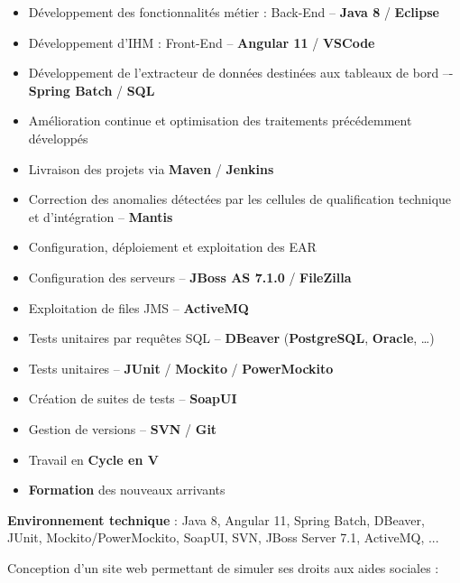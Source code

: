 \documentclass[12pt,a4paper,sans]{moderncv} %
\begin{document}
{\begin{itemize}
\item Développement des fonctionnalités métier : Back-End -- \textbf{Java 8} / \textbf{Eclipse}
\item Développement d'IHM : Front-End -- \textbf{Angular 11} / \textbf{VSCode}
\item Développement de l'extracteur de données destinées aux tableaux de bord –- \textbf{Spring Batch} / \textbf{SQL}
\item Amélioration continue et optimisation des traitements précédemment développés
\item Livraison des projets via \textbf{Maven} / \textbf{Jenkins}
\item Correction des anomalies détectées par les cellules de qualification technique et d’intégration -- \textbf{Mantis}
\item Configuration, déploiement et exploitation des EAR
\item Configuration des serveurs -- \textbf{JBoss AS 7.1.0} / \textbf{FileZilla}
\item Exploitation de files JMS -- \textbf{ActiveMQ}
\item Tests unitaires par requêtes SQL -- \textbf{DBeaver} (\textbf{PostgreSQL}, \textbf{Oracle}, …)
\item Tests unitaires -- \textbf{JUnit} / \textbf{Mockito} / \textbf{PowerMockito}
\item Création de suites de tests -- \textbf{SoapUI}
\item Gestion de versions -- \textbf{SVN} / \textbf{Git}
\item Travail en \textbf{Cycle en V}
\item \textbf{Formation} des nouveaux arrivants
\end{itemize}}

\vspace{1ex}

\textbf{Environnement technique} : Java 8, Angular 11, Spring Batch, DBeaver, JUnit, Mockito/PowerMockito, SoapUI, SVN, JBoss Server 7.1, ActiveMQ, ...

\newpage


\vspace{1ex}

Conception d'un site web permettant de simuler ses droits aux aides sociales :
\end{document}
